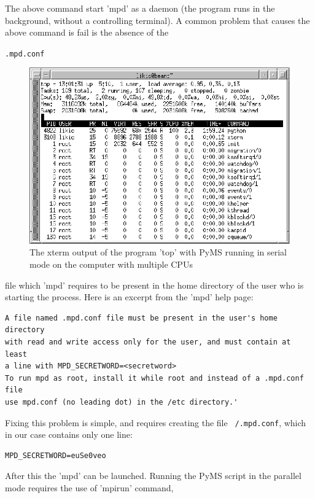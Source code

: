 The above command start 'mpd' as a daemon (the program runs in the
background, without a controlling terminal).  A common problem
that causes the above command is fail is the absence of the
{\tt .mpd.conf
\begin{figure}
  \begin{center}
    \includegraphics[scale=1.0]{graphics/chapter09/top-serial.eps}
  \end{center}
  \caption{The xterm output of the program 'top' with PyMS running in
  serial mode on the computer with multiple CPUs}
  \label{fig:top-serial}
\end{figure}
} file which 'mpd' requires to be present in the
home directory of the user who is starting the process. Here is
an excerpt from the 'mpd' help page:

\begin{verbatim}
A file named .mpd.conf file must be present in the user's home directory
with read and write access only for the user, and must contain at least
a line with MPD_SECRETWORD=<secretword>
To run mpd as root, install it while root and instead of a .mpd.conf file
use mpd.conf (no leading dot) in the /etc directory.' 
\end{verbatim}

Fixing this problem is simple, and requires creating the file
{\tt ~/.mpd.conf}, which in our case contains only one line:

\begin{verbatim}
MPD_SECRETWORD=euSe0veo
\end{verbatim}

After this the 'mpd' can be launched.  Running the PyMS script in the parallel
mode requires the use of 'mpirun' command,

